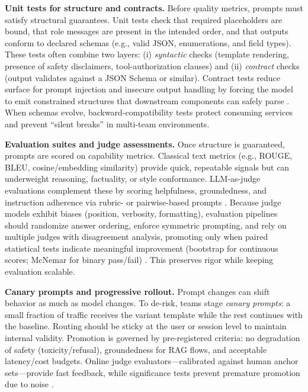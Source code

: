 \noindent\textbf{Unit tests for structure and contracts.}
Before quality metrics, prompts must satisfy structural guarantees. Unit tests check that required placeholders are bound, that role messages are present in the intended order, and that outputs conform to declared schemas (e.g., valid JSON, enumerations, and field types). These tests often combine two layers: (i) \emph{syntactic} checks (template rendering, presence of safety disclaimers, tool-authorization clauses) and (ii) \emph{contract} checks (output validates against a JSON Schema or similar). Contract tests reduce surface for prompt injection and insecure output handling by forcing the model to emit constrained structures that downstream components can safely parse \cite{owasp_llm}. When schemas evolve, backward-compatibility tests protect consuming services and prevent ``silent breaks'' in multi-team environments.

\noindent\textbf{Evaluation suites and judge assessments.}
Once structure is guaranteed, prompts are scored on capability metrics. Classical text metrics (e.g., ROUGE, BLEU, cosine/embedding similarity) provide quick, repeatable signals but can underweight reasoning, factuality, or style conformance. LLM-as-judge evaluations complement these by scoring helpfulness, groundedness, and instruction adherence via rubric- or pairwise-based prompts \cite{zheng2023judge,helm}. Because judge models exhibit biases (position, verbosity, formatting), evaluation pipelines should randomize answer ordering, enforce symmetric prompting, and rely on multiple judges with disagreement analysis, promoting only when paired statistical tests indicate meaningful improvement (bootstrap for continuous scores; McNemar for binary pass/fail) \cite{koehn2004,mcnemar1947}. This preserves rigor while keeping evaluation scalable.

\noindent\textbf{Canary prompts and progressive rollout.}
Prompt changes can shift behavior as much as model changes. To de-risk, teams stage \emph{canary prompts}: a small fraction of traffic receives the variant template while the rest continues with the baseline. Routing should be sticky at the user or session level to maintain internal validity. Promotion is governed by pre-registered criteria: no degradation of safety (toxicity/refusal), groundedness for RAG flows, and acceptable latency/cost budgets. Online judge evaluators---calibrated against human anchor sets---provide fast feedback, while significance tests prevent premature promotion due to noise \cite{mlflow_llm_eval,trulens,phoenix_rag}.

